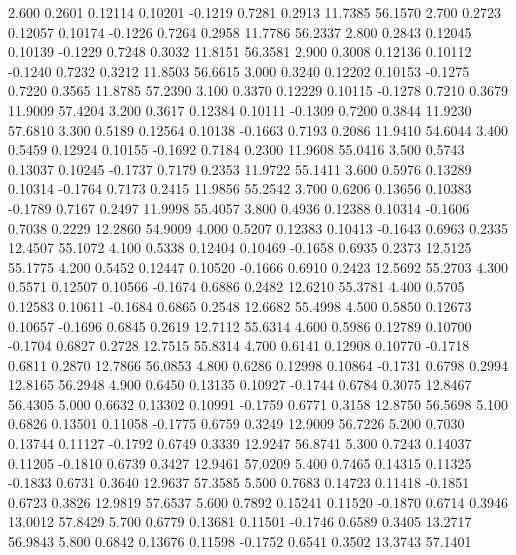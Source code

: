    2.600   0.2601   0.12114   0.10201  -0.1219   0.7281   0.2913  11.7385  56.1570
   2.700   0.2723   0.12057   0.10174  -0.1226   0.7264   0.2958  11.7786  56.2337
   2.800   0.2843   0.12045   0.10139  -0.1229   0.7248   0.3032  11.8151  56.3581
   2.900   0.3008   0.12136   0.10112  -0.1240   0.7232   0.3212  11.8503  56.6615
   3.000   0.3240   0.12202   0.10153  -0.1275   0.7220   0.3565  11.8785  57.2390
   3.100   0.3370   0.12229   0.10115  -0.1278   0.7210   0.3679  11.9009  57.4204
   3.200   0.3617   0.12384   0.10111  -0.1309   0.7200   0.3844  11.9230  57.6810
   3.300   0.5189   0.12564   0.10138  -0.1663   0.7193   0.2086  11.9410  54.6044
   3.400   0.5459   0.12924   0.10155  -0.1692   0.7184   0.2300  11.9608  55.0416
   3.500   0.5743   0.13037   0.10245  -0.1737   0.7179   0.2353  11.9722  55.1411
   3.600   0.5976   0.13289   0.10314  -0.1764   0.7173   0.2415  11.9856  55.2542
   3.700   0.6206   0.13656   0.10383  -0.1789   0.7167   0.2497  11.9998  55.4057
   3.800   0.4936   0.12388   0.10314  -0.1606   0.7038   0.2229  12.2860  54.9009
   4.000   0.5207   0.12383   0.10413  -0.1643   0.6963   0.2335  12.4507  55.1072
   4.100   0.5338   0.12404   0.10469  -0.1658   0.6935   0.2373  12.5125  55.1775
   4.200   0.5452   0.12447   0.10520  -0.1666   0.6910   0.2423  12.5692  55.2703
   4.300   0.5571   0.12507   0.10566  -0.1674   0.6886   0.2482  12.6210  55.3781
   4.400   0.5705   0.12583   0.10611  -0.1684   0.6865   0.2548  12.6682  55.4998
   4.500   0.5850   0.12673   0.10657  -0.1696   0.6845   0.2619  12.7112  55.6314
   4.600   0.5986   0.12789   0.10700  -0.1704   0.6827   0.2728  12.7515  55.8314
   4.700   0.6141   0.12908   0.10770  -0.1718   0.6811   0.2870  12.7866  56.0853
   4.800   0.6286   0.12998   0.10864  -0.1731   0.6798   0.2994  12.8165  56.2948
   4.900   0.6450   0.13135   0.10927  -0.1744   0.6784   0.3075  12.8467  56.4305
   5.000   0.6632   0.13302   0.10991  -0.1759   0.6771   0.3158  12.8750  56.5698
   5.100   0.6826   0.13501   0.11058  -0.1775   0.6759   0.3249  12.9009  56.7226
   5.200   0.7030   0.13744   0.11127  -0.1792   0.6749   0.3339  12.9247  56.8741
   5.300   0.7243   0.14037   0.11205  -0.1810   0.6739   0.3427  12.9461  57.0209
   5.400   0.7465   0.14315   0.11325  -0.1833   0.6731   0.3640  12.9637  57.3585
   5.500   0.7683   0.14723   0.11418  -0.1851   0.6723   0.3826  12.9819  57.6537
   5.600   0.7892   0.15241   0.11520  -0.1870   0.6714   0.3946  13.0012  57.8429
   5.700   0.6779   0.13681   0.11501  -0.1746   0.6589   0.3405  13.2717  56.9843
   5.800   0.6842   0.13676   0.11598  -0.1752   0.6541   0.3502  13.3743  57.1401

